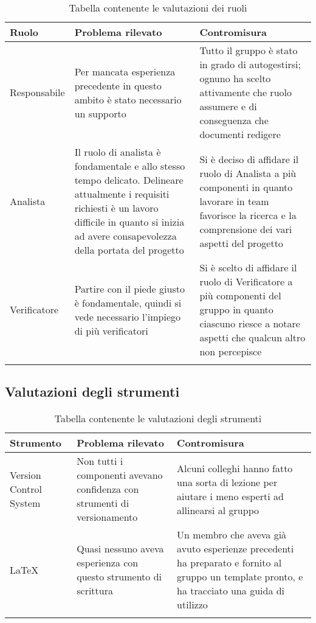 \documentclass[../piano_di_qualifica.tex]{subfiles}
\begin{document}
\begin{center}
\begin{longtable}{|p{3cm}|p{4.5cm}|p{4.5cm}|}
		\hline
		\rowcolor{lightgray}
            \textbf{Ruolo} & \textbf{Problema rilevato} &  \textbf{Contromisura} \\
            \hline 
            Responsabile &
            Per mancata esperienza precedente in questo ambito è stato necessario un supporto  &
            Tutto il gruppo è stato in grado di autogestirsi; ognuno ha scelto attivamente che ruolo assumere e di conseguenza che documenti redigere\\
            \hline
            Analista & 
            Il ruolo di analista è fondamentale e allo stesso tempo delicato. Delineare attualmente i requisiti richiesti è un lavoro difficile in quanto si inizia ad avere consapevolezza della portata del progetto &
            Si è deciso di affidare il ruolo di Analista a più componenti in quanto lavorare in team favorisce la ricerca e la comprensione dei vari aspetti del progetto \\
            \hline
            Verificatore &
            Partire con il piede giusto è fondamentale, quindi si vede necessario l'impiego di più verificatori &
            Si è scelto di affidare il ruolo di Verificatore a più componenti del gruppo in quanto ciascuno riesce a notare aspetti che qualcun altro non percepisce \\
            \hline

\caption{Tabella contenente le valutazioni dei ruoli }
\end{longtable}
\end{center}

\subsection{Valutazioni degli strumenti}
\label{sub:valut_strumenti}

\begin{center}
	\begin{longtable}{|p{3cm}|p{4.5cm}|p{4.5cm}|}
		\hline
		\rowcolor{lightgray}
            \textbf{Strumento} & \textbf{Problema rilevato} &  \textbf{Contromisura} \\
            \hline 
            Version Control System & 
            Non tutti i componenti avevano confidenza con strumenti di versionamento &
            Alcuni colleghi hanno fatto una sorta di lezione per aiutare i meno esperti ad allinearsi al gruppo \\
            \hline
            \LaTeX &
            Quasi nessuno aveva esperienza con questo strumento di scrittura &
            Un membro che aveva già avuto esperienze precedenti ha preparato e fornito al gruppo un template pronto, e ha tracciato una guida di utilizzo \\
            \hline

\caption{Tabella contenente le valutazioni degli strumenti}
\end{longtable}
\end{center}
\end{document}
